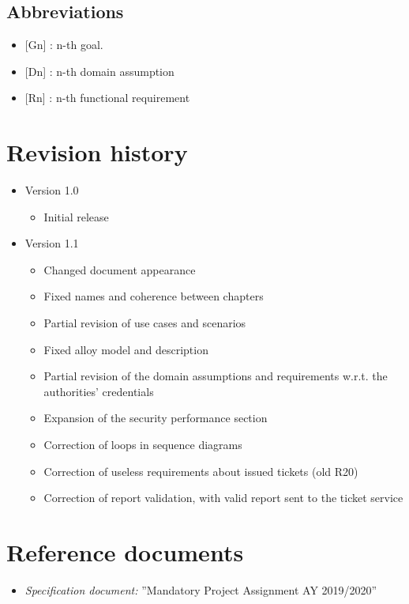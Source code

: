 			\subsection{Abbreviations}
				\begin{itemize}
					\item {[Gn]} : n-th goal.
					\item {[Dn]} : n-th domain assumption
					\item {[Rn]} : n-th functional requirement
				\end{itemize}
		\section{Revision history}
			\begin{itemize}
				\item Version 1.0
					\begin{itemize}
						\item Initial release
					\end{itemize}
				\item Version 1.1
					\begin{itemize}
						\item Changed document appearance
						\item Fixed names and coherence between chapters
						\item Partial revision of use cases and scenarios
						\item Fixed alloy model and description
						\item Partial revision of the domain assumptions and requirements w.r.t. the authorities' credentials
						\item Expansion of the security performance section
						\item Correction of loops in sequence diagrams
						\item Correction of useless requirements about issued tickets (old R20)
						\item Correction of report validation, with valid report sent to the ticket service
					\end{itemize}
			\end{itemize}
		\section{Reference documents}
			\begin{itemize}
				\item \textit{Specification document:} ''Mandatory Project Assignment AY 2019/2020''
			\end{itemize}
